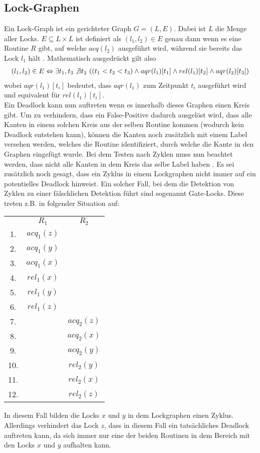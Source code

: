 \subsection{Lock-Graphen}
Ein Lock-Graph ist ein gerichteter Graph $G = (L, E)$. Dabei ist $L$ die Menge 
aller Locks. $E \subseteq L \times L$ ist definiert als $(l_1, l_2) \in E$ genau 
dann wenn es eine Routine $R$ gibt, auf welche $acq(l_2)$ ausgeführt wird, während sie 
bereits das Lock $l_1$ hält \cite{bensalem}. Mathematisch ausgedrückt gilt also 
\begin{align*}
    (l_1, l_2) \in E \Leftrightarrow \exists t_1, t_3 \not\exists t_2\ ((t_1 < t_2 < t_3) \land aqr(l_1)[t_1] \land rel(l_1)[t_2] \land  aqr(l_2)[t_3])
\end{align*}
wobei $aqr(l_1)[t_i]$ bedeutet, dass $aqr(l_1)$ zum Zeitpunkt $t_i$ ausgeführt 
wird und equivalent für $rel(l_1)[t_i]$.\\
Ein Deadlock kann nun auftreten wenn es innerhalb dieses Graphen einen Kreis 
gibt. Um zu verhindern, dass ein False-Positive dadurch ausgelöst wird, dass 
alle Kanten in einem solchen Kreis aus der selben Routine kommen (wodurch kein 
Deadlock entstehen kann), können die Kanten noch zusätzlich mit einem Label 
versehen werden, welches die Routine identifiziert, durch welche die Kante in 
den Graphen eingefügt wurde. Bei dem Testen nach Zyklen muss nun beachtet 
werden, dass nicht alle Kanten in dem Kreis das selbe Label haben 
\cite{bensalem}. Es sei zusätzlich noch gesagt, dass ein Zyklus in einem 
Lockgraphen nicht immer auf ein potentielles Deadlock hinweist. Ein solcher 
Fall, bei dem die Detektion von Zyklen zu einer fälschlichen Detektion 
führt sind sogenannt Gate-Locks. Diese treten z.B. in folgender Situation
auf:
\begin{table}[H]
     \centering
     \begin{tabular}{ccc}
        & $R_1$        & $R_2$          \\
     1. & $acq_{1}(z)$ &                \\
     2. & $acq_{1}(y)$ &                \\
     3. & $acq_{1}(x)$ &                \\
     4. & $rel_{1}(x)$ &                \\
     5. & $rel_{1}(y)$ &                \\
     6. & $rel_{1}(z)$ &                \\
     7. &              & $acq_{2}(z)$ \\
     8. &              & $acq_{2}(x)$ \\
     9. &              & $acq_{2}(y)$ \\
    10. &              & $rel_{2}(y)$ \\
    11. &              & $rel_{2}(x)$ \\
    12. &              & $rel_{2}(z)$
    \end{tabular}
\end{table}
In diesem Fall bilden die Locks $x$ und $y$ in dem Lockgraphen einen Zyklus. 
Allerdings verhindert das Lock $z$, dass in diesem Fall ein tatsächliches 
Deadlock auftreten kann, da sich immer nur eine der beiden Routinen 
in dem Bereich mit den Locks $x$ und $y$ aufhalten kann.

